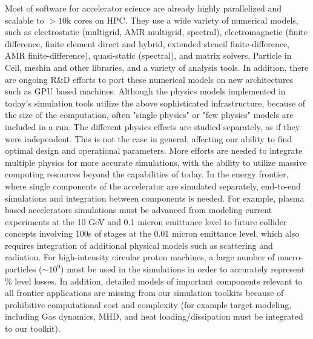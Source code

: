 Most of software for accelerator science are already  highly parallelized and scalable to $> 10$k cores on HPC. They use a wide variety of numerical models, such as electrostatic (multigrid, AMR multigrid, spectral), electromagnetic (finite difference, finite element direct and hybrid, extended stencil finite-difference, AMR finite-difference), quasi-static (spectral), and  matrix solvers, Particle in Cell, meshin and other libraries, and a variety of analysis tools. In addition, there are ongoing R\&D efforts to port these numerical models on new architectures such as GPU based machines.  Although the physics models implemented in today's simulation tools utilize the above sophisticated infrastructure, because of the size of the computation, often "single physics" or "few physics" models are included in a run. The different physics effects are studied separately, as if they were independent.  This is not the case in general, affecting our ability to find optimal design and operational parameters.  More efforts are needed to integrate multiple physics for more accurate simulations, with the ability to utilize massive computing resources beyond the capabilities of today. In the energy frontier, where single components of the accelerator are simulated separately, end-to-end simulations and integration between components is needed.  For example, plasma based accelerators simulations must be advanced from modeling current experiments at the 10 GeV and 0.1 micron emittance level to future collider concepts involving 100s of stages at the 0.01 micron emittance level, which also requires integration of additional physical models such as scattering and radiation. For high-intensity circular proton machines, a large number of macro-particles ($\sim 10^9$) must be used in the simulations in order to accurately represent \% level losses. In addition, detailed models of important components relevant to all frontier applications are missing from our simulation toolkits because of prohibitive computational cost and complexity (for example target modeling, including Gas dynamics, MHD, and heat loading/dissipation must be integrated to our toolkit). 